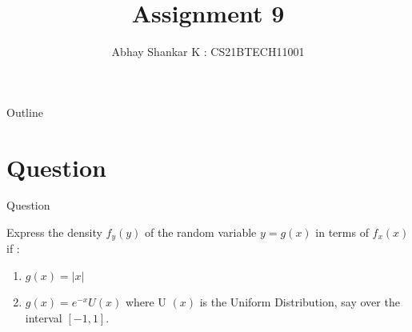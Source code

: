 \documentclass{beamer}
\DeclareMathOperator*{\pipe}{|}
\begin{document}
\newcommand{\bfr}[2]{\section{#1} \begin{frame}{#1} #2 \end{frame}}

	\title{Assignment 9}
		\author{ Abhay Shankar K : CS21BTECH11001}
\date{}
	\begin{frame}
    		\titlepage 
	\end{frame}

	\begin{frame}{Outline}
    		\tableofcontents
	\end{frame}

	\providecommand{\brak}[1]{\ensuremath{\left(#1\right)}}
	\providecommand{\sbrak}[1]{\ensuremath{\left[#1\right]}}
	\providecommand{\cbrak}[1]{\ensuremath{\left\{#1\right\}}}
	\providecommand{\req}{\textbf{Required :}}
	\providecommand{\rpr}[2]{\ensuremath{P_{#1}\left(#2\right)}} %
	\providecommand{\spr}[1]{\ensuremath{P\left(#1\right)}} %
	\providecommand{\cpr}[2]{\ensuremath{\spr{#1 \pipe #2}}} %
	\newcommand*{\permcomb}[4][0mu]{{{}^{#3}\mkern#1#2_{#4}}}
	\newcommand*{\perm}[1][-3mu]{\permcomb[#1]{P}}
	\newcommand*{\comb}[1][-1mu]{\permcomb[#1]{C}}
	\newcommand{\abs}[1]{\left| #1 \right|}
	\newcommand{\pow}[2]{\ensuremath{#1^{#2}}}
	\newcommand{\e}[1]{\pow{e}{#1}}
	
	\providecommand{\pdf}[2]{\ensuremath{f_{#2}\left(#1\right)}}
	\providecommand{\cdf}[2]{\ensuremath{F_{#2}\left(#1\right)}}
	
	\bfr{Question}{
	
	Express the density \pdf{y}{y} of the random variable $y = g \brak{x}$ in terms of \pdf{x}{x} if :
	\begin{enumerate}[label = \brak{\textbf{\roman*}}]
	
		\item $g \brak{x} = \abs{x}$
		
		\item $g \brak{x} = \e{-x} U\brak{x}$ where U \brak{x} is the Uniform Distribution, say over the interval \sbrak{-1, 1}.		
	\end{enumerate}
	
	}
	
\end{document}

